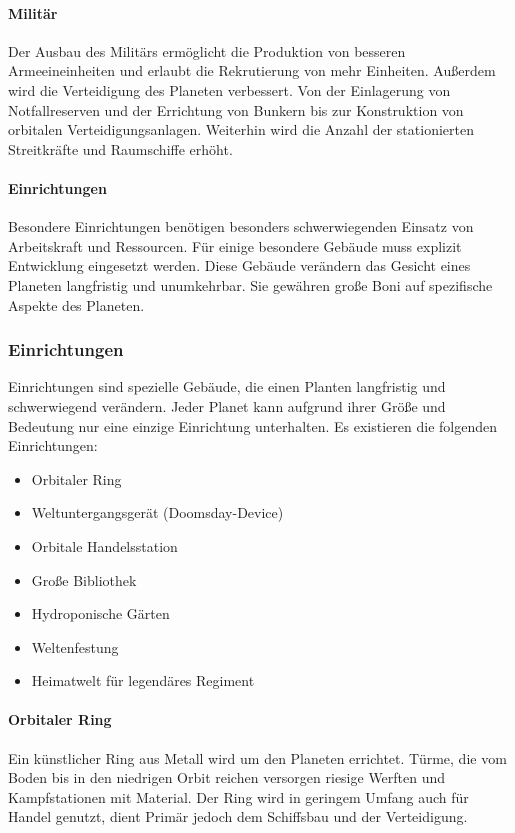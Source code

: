 \documentclass[11pt, a4paper]{article}
\begin{document}
\paragraph{Militär}
Der Ausbau des Militärs ermöglicht die Produktion von besseren Armeeineinheiten und erlaubt die Rekrutierung
von mehr Einheiten. Außerdem wird die Verteidigung des Planeten verbessert. Von der Einlagerung von 
Notfallreserven und der Errichtung von Bunkern bis zur Konstruktion von orbitalen Verteidigungsanlagen.
Weiterhin wird die Anzahl der stationierten Streitkräfte und Raumschiffe erhöht.
%
\paragraph{Einrichtungen}
Besondere Einrichtungen benötigen besonders schwerwiegenden Einsatz von Arbeitskraft und Ressourcen.
Für einige besondere Gebäude muss explizit Entwicklung eingesetzt werden. Diese Gebäude verändern das Gesicht
eines Planeten langfristig und unumkehrbar. Sie gewähren große Boni auf spezifische Aspekte des Planeten.
%
\subsubsection{Einrichtungen}
Einrichtungen sind spezielle Gebäude, die einen Planten langfristig und schwerwiegend verändern.
Jeder Planet kann aufgrund ihrer Größe und Bedeutung nur eine einzige Einrichtung unterhalten.
Es existieren die folgenden Einrichtungen:
\begin{itemize}
    \item Orbitaler Ring
    \item Weltuntergangsgerät (Doomsday-Device)
    \item Orbitale Handelsstation
    \item Große Bibliothek
    \item Hydroponische Gärten
    \item Weltenfestung
    \item Heimatwelt für legendäres Regiment
\end{itemize}
%
\paragraph{Orbitaler Ring}
Ein künstlicher Ring aus Metall wird um den Planeten errichtet. Türme, die vom Boden bis in den niedrigen
Orbit reichen versorgen riesige Werften und Kampfstationen mit Material. Der Ring wird in geringem Umfang auch
für Handel genutzt, dient Primär jedoch dem Schiffsbau und der Verteidigung.
%
\end{document}
